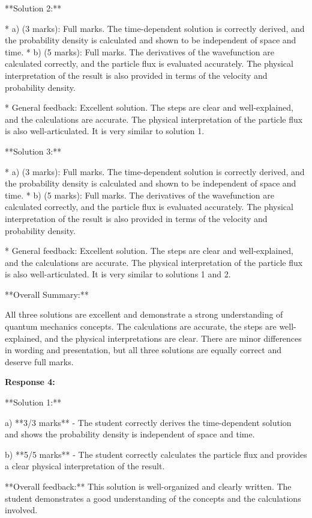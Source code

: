 \documentclass[a4paper,11pt]{article}
\begin{document}
**Solution 2:**

* a) (3 marks): Full marks. The time-dependent solution is correctly derived, and the probability density is calculated and shown to be independent of space and time.
* b) (5 marks): Full marks. The derivatives of the wavefunction are calculated correctly, and the particle flux is evaluated accurately. The physical interpretation of the result is also provided in terms of the velocity and probability density.

* General feedback: Excellent solution. The steps are clear and well-explained, and the calculations are accurate. The physical interpretation of the particle flux is also well-articulated. It is very similar to solution 1.

**Solution 3:**

* a) (3 marks): Full marks. The time-dependent solution is correctly derived, and the probability density is calculated and shown to be independent of space and time.
* b) (5 marks): Full marks. The derivatives of the wavefunction are calculated correctly, and the particle flux is evaluated accurately. The physical interpretation of the result is also provided in terms of the velocity and probability density.

* General feedback: Excellent solution. The steps are clear and well-explained, and the calculations are accurate. The physical interpretation of the particle flux is also well-articulated. It is very similar to solutions 1 and 2.

**Overall Summary:**

All three solutions are excellent and demonstrate a strong understanding of quantum mechanics concepts. The calculations are accurate, the steps are well-explained, and the physical interpretations are clear. There are minor differences in wording and presentation, but all three solutions are equally correct and deserve full marks.

\textbf{Response 4:}

**Solution 1:**

a) **3/3 marks** - The student correctly derives the time-dependent solution and shows the probability density is independent of space and time.

b) **5/5 marks** - The student correctly calculates the particle flux and provides a clear physical interpretation of the result.

**Overall feedback:** This solution is well-organized and clearly written. The student demonstrates a good understanding of the concepts and the calculations involved.
\end{document}
